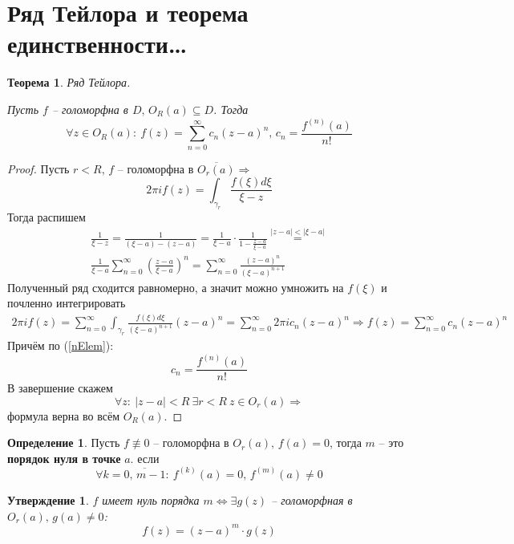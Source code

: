 \documentclass[a4paper,12pt]{article}
\theoremstyle{plain}
\newtheorem{theorem}{Теорема}[section]
\newtheorem{proposition}{Утверждение}[section]
\theoremstyle{definition}
\newtheorem{definition}{Определение}[section]
\theoremstyle{remark}
\begin{document}
\section{Ряд Тейлора и теорема единственности\dots}
\begin{theorem}\label{Taylor}
	Ряд Тейлора.

	Пусть $f$ -- голоморфна в $D,\, O_R(a) \subseteq D$. Тогда
	\[
		\forall z \in O_R(a) :\: f(z) = \sum_{n = 0}^\infty c_n(z - a)^n,\, c_n = \frac{f^{(n)}(a)}{n!}
	\]
\end{theorem}

\begin{proof}
	Пусть $r < R,\, f$ -- голоморфна в $\overline{O_r(a)} \Rightarrow$
	\[
		2\pi if(z) = \int_{\gamma_r}\frac{f(\xi)d\xi}{\xi - z}
	\]
	Тогда распишем
	\begin{align*}
		\frac{1}{\xi - z} = \frac{1}{(\xi - a) - (z - a)} = \frac{1}{\xi - a}\cdot\frac{1}{1 - \frac{z - a}{\xi - a}} \overset{\vert z - a\vert < \vert \xi - a\vert}{=} \\
		\frac{1}{\xi - a}\sum_{n = 0}^\infty \left(\frac{z - a}{\xi - a}\right)^n = \sum_{n = 0}^\infty \frac{(z - a)^n}{(\xi - a)^{n + 1}}
	\end{align*}
	Полученный ряд сходится равномерно, а значит можно умножить на $f(\xi)$ и почленно интегрировать
	\begin{align*}
		2\pi i f(z) = \sum_{n = 0}^\infty \int_{\gamma_r}\frac{f(\xi)d\xi}{(\xi - a)^{n + 1}}(z - a)^n = \sum_{n = 0}^\infty 2\pi i c_n(z - a)^n \Rightarrow f(z) = \sum_{n = 0}^\infty c_n(z - a)^n
	\end{align*}
	Причём по (\ref{nElem}):
	\[
		c_n = \frac{f^{(n)}(a)}{n!}
	\]
	В завершение скажем
	\[
		\forall z :\: \vert z - a\vert < R \: \exists r < R \: z \in O_r(a) \Rightarrow
	\]
	формула верна во всём $O_R(a)$.
\end{proof}

\begin{definition}
	Пусть $f \not\equiv 0$ -- голоморфна в $O_r(a),\, f(a) = 0$, тогда $m$ -- это \textbf{порядок нуля в точке} $a$. если
	\[
		\forall k = \overline{0,\, m - 1} :\: f^{(k)}(a) = 0,\, f^{(m)}(a) \neq 0
	\]
\end{definition}

\begin{proposition}
	$f$ имеет нуль порядка $m \Leftrightarrow \exists g(z)$ -- голоморфная в $O_r(a),\, g(a) \neq 0$:
	\[
		f(z) = (z - a)^m\cdot g(z)
	\]
\end{proposition}
\end{document}
